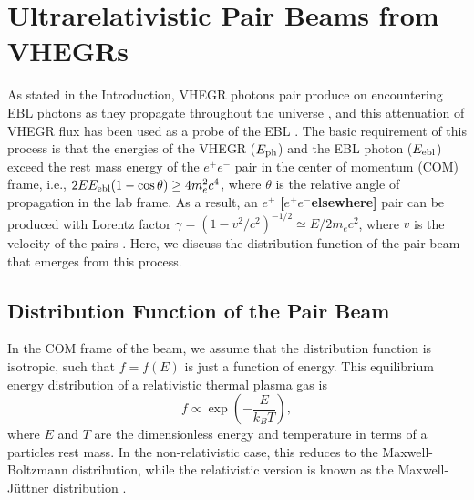 \documentclass[usenatbib,iop,apj,numberedappendix]{aeb_emulateapj_2015}
\newcommand\ab[1]{{\color{green} \bf #1}} %
\newcommand{\epm}{\ensuremath{e^+e^-}}
\begin{document}
\section{Ultrarelativistic Pair Beams from VHEGRs}\label{sec:setup}

As stated in the Introduction, VHEGR photons pair produce on encountering EBL
photons as they propagate throughout the universe \citep{Gould+66}, and this
attenuation of VHEGR flux has been used as a probe of the EBL
\citep{Stec-deJa-Sala:92,deJa-Stec-Sala:94,Ahar_etal:06}.  The basic requirement
of this process is that the energies of the VHEGR ($E_{\rm ph}$) and the EBL
photon ($E_{\rm ebl}$) exceed the rest mass energy of the $e^+e^-$ pair in the
center of momentum (COM) frame, i.e., $2 E E_{\rm ebl}(1-\cos\theta) \geq 4
m_e^2 c^4$, where $\theta$ is the relative angle of propagation in the lab
frame. As a result, an $e^\pm$ \ab{[\epm elsewhere]} pair can be produced with Lorentz factor $\gamma = \left(1-v^2/c^2\right)^{-1/2} \simeq E/2m_e
c^2$, where $v$ is the velocity of the pairs \citep{Goul-Schr:67}.  Here, we discuss the distribution function of the
pair beam that emerges from this process.



  

\subsection{Distribution Function of the Pair Beam}

In the COM frame of the beam, we assume that the distribution function is isotropic, such that $f=f(E)$ is just a function of energy.   This equilibrium energy distribution of a relativistic thermal plasma gas is
\begin{equation}\label{eq:relativistic maxwellian}
f\propto \exp\left(-\frac E {k_BT}\right),
\end{equation}
 where $E$ and $T$ are the dimensionless energy and temperature in terms of a particles rest mass.  In the non-relativistic case, this reduces to the Maxwell-Boltzmann distribution, while the relativistic version is known as the Maxwell-J{\"u}ttner distribution \citep{1911AnP...340..145J}. 
\end{document}
